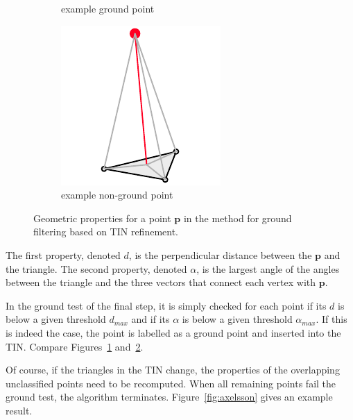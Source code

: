 \begin{figure}[htb]
\begin{subfigure}[b]{0.3\linewidth}
    \caption{example ground point}
    \label{fig:ground-filtering:ground}
  \end{subfigure}
  \begin{subfigure}[b]{0.3\linewidth}
    \centering
    \includegraphics[width=\textwidth]{figs/groundfilter-nonground.pdf}
    \caption{example non-ground point}
    \label{fig:ground-filtering:nonground}
  \end{subfigure}
\caption{Geometric properties for a point $\mathbf{p}$ in the method for ground filtering based on TIN refinement.}
\label{fig:ground-filtering}
\end{figure}
The first property, denoted $d$, is the perpendicular distance between the $\mathbf{p}$ and the triangle.
The second property, denoted $\alpha$, is the largest angle of the angles between the triangle and the three vectors that connect each vertex with $\mathbf{p}$. 

In the ground test of the final step, it is simply checked for each point if its $d$ is below a given threshold $d_{max}$ and if its $\alpha$ is below a given threshold $\alpha_{max}$.
If this is indeed the case, the point is labelled as a ground point and inserted into the TIN.
Compare Figures~\ref{fig:ground-filtering:ground} and~\ref{fig:ground-filtering:nonground}.

Of course, if the triangles in the TIN change, the properties of the overlapping unclassified points need to be recomputed. 
When all remaining points fail the ground test, the algorithm terminates.
Figure~\ref{fig:axelsson} gives an example result.

